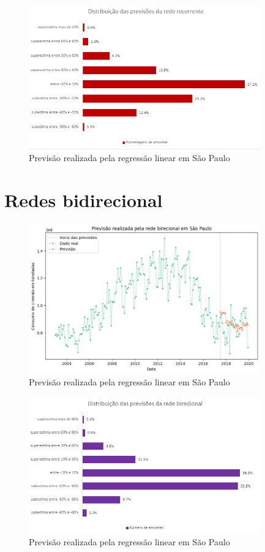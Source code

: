 \begin{figure}[H]
    \centering
    \includegraphics[width=10cm]{../figuras/graficos/rnn/erro-perc-rnn.png}
    \caption{Previsão realizada pela regressão linear em São Paulo}
    \label{consumo-sp}
\end{figure}


\section{Redes bidirecional}

\begin{figure}[H]
    \centering
    \includegraphics[width=10cm]{../figuras/graficos/bi/prev-sp-bi.png}
    \caption{Previsão realizada pela regressão linear em São Paulo}
    \label{consumo-sp}
\end{figure}

\begin{figure}[H]
    \centering
    \includegraphics[width=10cm]{../figuras/graficos/bi/erro-perc-bi.png}
    \caption{Previsão realizada pela regressão linear em São Paulo}
    \label{consumo-sp}
\end{figure}